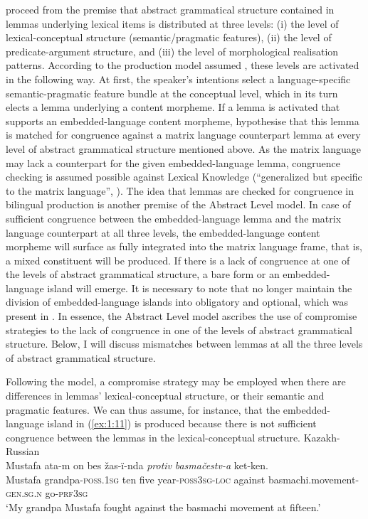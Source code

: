 \begin{sloppypar}
\citet{myers-scotton-matching-1995} proceed from the premise that abstract grammatical structure contained in lemmas underlying lexical items is distributed at three levels: (i) the level of lexical-conceptual structure (semantic/pragmatic features), (ii) the level of predicate-argument structure, and (iii) the level of morphological realisation patterns. According to the production model assumed \citep[23--25, 76--78]{myers-scotton-contact-2002}, these levels are activated in the following way. At first, the speaker's intentions select a language-specific semantic-pragmatic feature bundle at the conceptual level, which in its turn elects a lemma underlying a content morpheme. If a lemma is activated that supports an embedded-language content morpheme, \citet{myers-scotton-matching-1995} hypothesise that this lemma is matched for congruence against a matrix language counterpart lemma at every level of abstract grammatical structure mentioned above. As the matrix language may lack a counterpart for the given embedded-language lemma, congruence checking is assumed possible against Lexical Knowledge (``generalized but specific to the matrix language'', \citealt[97]{myers-scotton-contact-2002}). The idea that lemmas are checked for congruence in bilingual production is another premise of the Abstract Level model. In case of sufficient congruence between the embedded-language lemma and the matrix language counterpart at all three levels, the embedded-language content morpheme will surface as fully integrated into the matrix language frame, that is, a mixed constituent will be produced. If there is a lack of congruence at one of the levels of abstract grammatical structure, a bare form or an embedded-language island will emerge. It is necessary to note that \citet[][]{myers-scotton-matching-1995} no longer maintain the division of embedded-language islands into obligatory and optional, which was present in \citet{myers-scotton-duelling-1993}. In essence, the Abstract Level model ascribes the use of compromise strategies to the lack of congruence in one of the levels of abstract grammatical structure. Below, I will discuss mismatches between lemmas at all the three levels of abstract grammatical structure.
\end{sloppypar}

Following the model, a compromise strategy may be employed when there are differences in lemmas' lexical-conceptual structure, or their semantic and pragmatic features. We can thus assume, for instance, that the embedded-language island in (\ref{ex:1:11}) is produced because there is not sufficient congruence between the lemmas in the lexical-conceptual structure.
\ea{\label{ex:1:11}}
Kazakh-Russian \citep[41--42]{muhamedowa-untersuchung-2006}\\
\gll 
Mustafa ata-m on bes žas-ï-nda \textit{protiv} \textit{basmačestv-a} ket-ken.\\
	Mustafa grandpa-\textsc{poss.1sg} ten five year-\textsc{poss3sg-loc} against basmachi.movement-\textsc{gen.sg.n} go-\textsc{prf3sg}\\
\glt `My grandpa Mustafa fought against the basmachi movement at fifteen.' 
\z

